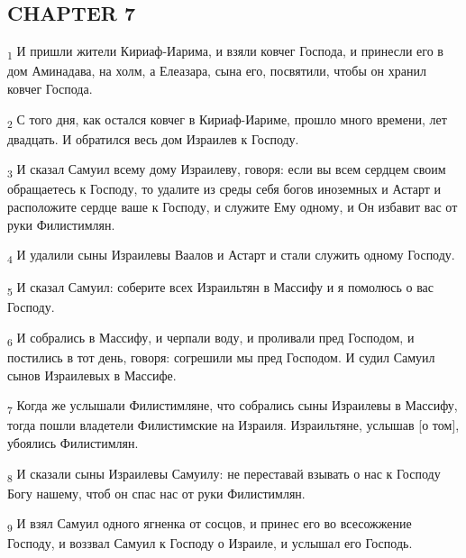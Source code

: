 \subsection{CHAPTER 7}
\begin{tcolorbox}
\textsubscript{1} И пришли жители Кириаф-Иарима, и взяли ковчег Господа, и принесли его в дом Аминадава, на холм, а Елеазара, сына его, посвятили, чтобы он хранил ковчег Господа.
\end{tcolorbox}
\begin{tcolorbox}
\textsubscript{2} С того дня, как остался ковчег в Кириаф-Иариме, прошло много времени, лет двадцать. И обратился весь дом Израилев к Господу.
\end{tcolorbox}
\begin{tcolorbox}
\textsubscript{3} И сказал Самуил всему дому Израилеву, говоря: если вы всем сердцем своим обращаетесь к Господу, то удалите из среды себя богов иноземных и Астарт и расположите сердце ваше к Господу, и служите Ему одному, и Он избавит вас от руки Филистимлян.
\end{tcolorbox}
\begin{tcolorbox}
\textsubscript{4} И удалили сыны Израилевы Ваалов и Астарт и стали служить одному Господу.
\end{tcolorbox}
\begin{tcolorbox}
\textsubscript{5} И сказал Самуил: соберите всех Израильтян в Массифу и я помолюсь о вас Господу.
\end{tcolorbox}
\begin{tcolorbox}
\textsubscript{6} И собрались в Массифу, и черпали воду, и проливали пред Господом, и постились в тот день, говоря: согрешили мы пред Господом. И судил Самуил сынов Израилевых в Массифе.
\end{tcolorbox}
\begin{tcolorbox}
\textsubscript{7} Когда же услышали Филистимляне, что собрались сыны Израилевы в Массифу, тогда пошли владетели Филистимские на Израиля. Израильтяне, услышав [о том], убоялись Филистимлян.
\end{tcolorbox}
\begin{tcolorbox}
\textsubscript{8} И сказали сыны Израилевы Самуилу: не переставай взывать о нас к Господу Богу нашему, чтоб он спас нас от руки Филистимлян.
\end{tcolorbox}
\begin{tcolorbox}
\textsubscript{9} И взял Самуил одного ягненка от сосцов, и принес его во всесожжение Господу, и воззвал Самуил к Господу о Израиле, и услышал его Господь.
\end{tcolorbox}
